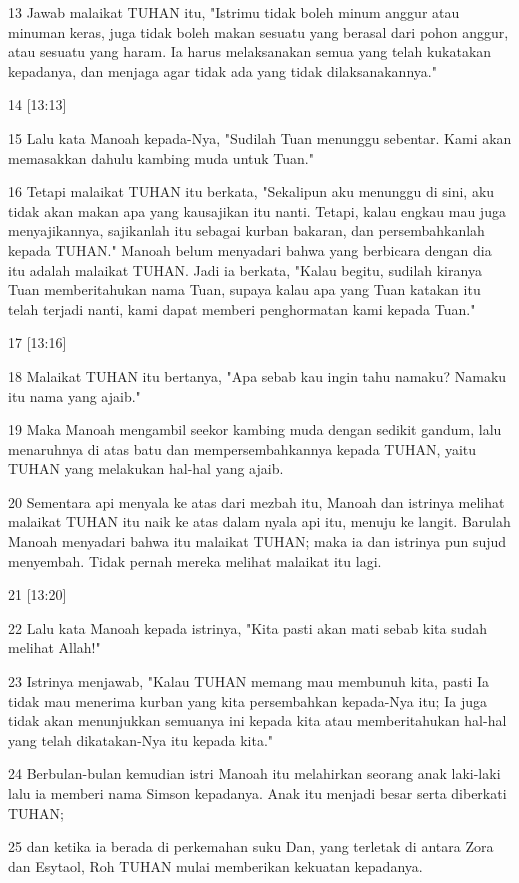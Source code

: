 \par 13 Jawab malaikat TUHAN itu, "Istrimu tidak boleh minum anggur atau minuman keras, juga tidak boleh makan sesuatu yang berasal dari pohon anggur, atau sesuatu yang haram. Ia harus melaksanakan semua yang telah kukatakan kepadanya, dan menjaga agar tidak ada yang tidak dilaksanakannya."
\par 14 [13:13]
\par 15 Lalu kata Manoah kepada-Nya, "Sudilah Tuan menunggu sebentar. Kami akan memasakkan dahulu kambing muda untuk Tuan."
\par 16 Tetapi malaikat TUHAN itu berkata, "Sekalipun aku menunggu di sini, aku tidak akan makan apa yang kausajikan itu nanti. Tetapi, kalau engkau mau juga menyajikannya, sajikanlah itu sebagai kurban bakaran, dan persembahkanlah kepada TUHAN." Manoah belum menyadari bahwa yang berbicara dengan dia itu adalah malaikat TUHAN. Jadi ia berkata, "Kalau begitu, sudilah kiranya Tuan memberitahukan nama Tuan, supaya kalau apa yang Tuan katakan itu telah terjadi nanti, kami dapat memberi penghormatan kami kepada Tuan."
\par 17 [13:16]
\par 18 Malaikat TUHAN itu bertanya, "Apa sebab kau ingin tahu namaku? Namaku itu nama yang ajaib."
\par 19 Maka Manoah mengambil seekor kambing muda dengan sedikit gandum, lalu menaruhnya di atas batu dan mempersembahkannya kepada TUHAN, yaitu TUHAN yang melakukan hal-hal yang ajaib.
\par 20 Sementara api menyala ke atas dari mezbah itu, Manoah dan istrinya melihat malaikat TUHAN itu naik ke atas dalam nyala api itu, menuju ke langit. Barulah Manoah menyadari bahwa itu malaikat TUHAN; maka ia dan istrinya pun sujud menyembah. Tidak pernah mereka melihat malaikat itu lagi.
\par 21 [13:20]
\par 22 Lalu kata Manoah kepada istrinya, "Kita pasti akan mati sebab kita sudah melihat Allah!"
\par 23 Istrinya menjawab, "Kalau TUHAN memang mau membunuh kita, pasti Ia tidak mau menerima kurban yang kita persembahkan kepada-Nya itu; Ia juga tidak akan menunjukkan semuanya ini kepada kita atau memberitahukan hal-hal yang telah dikatakan-Nya itu kepada kita."
\par 24 Berbulan-bulan kemudian istri Manoah itu melahirkan seorang anak laki-laki lalu ia memberi nama Simson kepadanya. Anak itu menjadi besar serta diberkati TUHAN;
\par 25 dan ketika ia berada di perkemahan suku Dan, yang terletak di antara Zora dan Esytaol, Roh TUHAN mulai memberikan kekuatan kepadanya.

